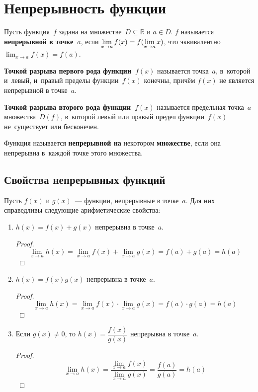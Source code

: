 \section{Непрерывность функции}
 Пусть функция~$f$ задана на множестве~$D \subseteq \mathbb R$ и $a \in D$.
$f$ называется \textbf{непрерывной в точке~$a$}, если $\displaystyle \lim_{x \to a} f(x) \opbr= f(\lim_{x \to a} x)$, что эквивалентно $\displaystyle \lim_{x \to a} f(x) = f(a)$.

 \textbf{Точкой разрыва первого рода функции~$f(x)$} называется точка~$a$, в~которой и~левый, и~правый пределы функции~$f(x)$ конечны, причём $f(x)$ не является непрерывной в точке~$a$.

\textbf{Точкой разрыва второго рода функции~$f(x)$} называется предельная точка~$a$ множества~$D(f)$, в~которой левый или правый предел функции~$f(x)$ не~существует или бесконечен.

Функция называется \textbf{непрерывной на} некотором \textbf{множестве}, если она непрерывна в~каждой точке этого множества.

\subsection{Свойства непрерывных функций}
Пусть $f(x)$ и $g(x)$~--- функции, непрерывные в точке~$a$.
Для них справедливы следующие арифметические свойства:
\begin{enumerate}
	\item $h(x) = f(x) + g(x)$ непрерывна в точке~$a$.
	\begin{proof}
	\begin{equation*}
	\lim_{x \to a} h(x) =
	\lim_{x \to a} f(x) + \lim_{x \to a} g(x) =
	f(a) + g(a) =
	h(a)
	\end{equation*}
	\end{proof}
	
	\item $h(x) = f(x)g(x)$ непрерывна в точке~$a$.
	\begin{proof}
	\begin{equation*}
	\lim_{x \to a} h(x) =
	\lim_{x \to a} f(x) \cdot \lim_{x \to a} g(x) =
	f(a) \cdot g(a) =
	h(a)
	\end{equation*}
	\end{proof}
	
	\item Если $g(x) \neq 0$, то $h(x) = \dfrac{f(x)}{g(x)}$ непрерывна в точке~$a$.
	\begin{proof}
	\begin{equation*}
	\lim_{x \to a} h(x) =
	\frac{\displaystyle \lim_{x \to a} f(x)}{\displaystyle \lim_{x \to a} g(x)} =
	\frac{f(a)}{g(a)} =
	h(a)
	\end{equation*}
	\end{proof}
\end{enumerate}


